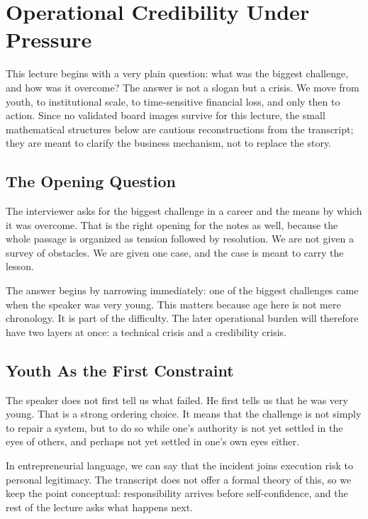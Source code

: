 \chapter{Operational Credibility Under Pressure}

This lecture begins with a very plain question: what was the biggest challenge, and how was it overcome? The answer is not a slogan but a crisis. We move from youth, to institutional scale, to time-sensitive financial loss, and only then to action. Since no validated board images survive for this lecture, the small mathematical structures below are cautious reconstructions from the transcript; they are meant to clarify the business mechanism, not to replace the story.

\section{The Opening Question}

The interviewer asks for the biggest challenge in a career and the means by which it was overcome. That is the right opening for the notes as well, because the whole passage is organized as tension followed by resolution. We are not given a survey of obstacles. We are given one case, and the case is meant to carry the lesson.

The answer begins by narrowing immediately: one of the biggest challenges came when the speaker was very young. This matters because age here is not mere chronology. It is part of the difficulty. The later operational burden will therefore have two layers at once: a technical crisis and a credibility crisis.

\section{Youth As the First Constraint}

The speaker does not first tell us what failed. He first tells us that he was very young. That is a strong ordering choice. It means that the challenge is not simply to repair a system, but to do so while one's authority is not yet settled in the eyes of others, and perhaps not yet settled in one's own eyes either.

In entrepreneurial language, we can say that the incident joins execution risk to personal legitimacy. The transcript does not offer a formal theory of this, so we keep the point conceptual: responsibility arrives before self-confidence, and the rest of the lecture asks what happens next.

